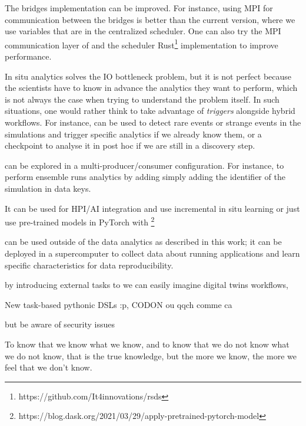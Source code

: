 The \deisa bridges implementation can be improved. For instance, using MPI for communication between the bridges is better than the current version, where we use \dask variables that are in the centralized scheduler. One can also try the MPI communication layer of \dask\cite{shafi_efficient_2021} and the scheduler Rust\footnote{https://github.com/It4innovations/rsds} implementation to improve performance.   

In situ analytics solves the IO bottleneck problem, but it is not perfect because the scientists have to know in advance the analytics they want to perform, which is not always the case when trying to understand the problem itself. In such situations, one would rather think to take advantage of \textit{triggers} alongside hybrid workflows. For instance, \deisa can be used to detect rare events or strange events in the simulations and trigger specific analytics if we already know them, or a checkpoint to analyse it in post hoc if we are still in a discovery step. 

\deisa can be explored in a multi-producer/consumer configuration. For instance, to perform ensemble runs analytics by adding simply adding the identifier of the simulation in data keys. 

It can be used for HPI/AI integration and use incremental in situ learning or just use pre-trained models in PyTorch with \dask \footnote{ https://blog.dask.org/2021/03/29/apply-pretrained-pytorch-model}

\deisa can be used outside of the data analytics as described in this work; it can be deployed in a supercomputer to collect data about running applications and learn specific characteristics for data reproducibility. 

by introducing external tasks to \dask we can easily imagine digital twins workflows,

New task-based pythonic DSLs :p, CODON ou qqch comme ca  

but be aware of security issues 

To know that we know what we know, and to know that we do not know what we do not know, that is the true knowledge, but the more we know, the more we feel that we don't know. 